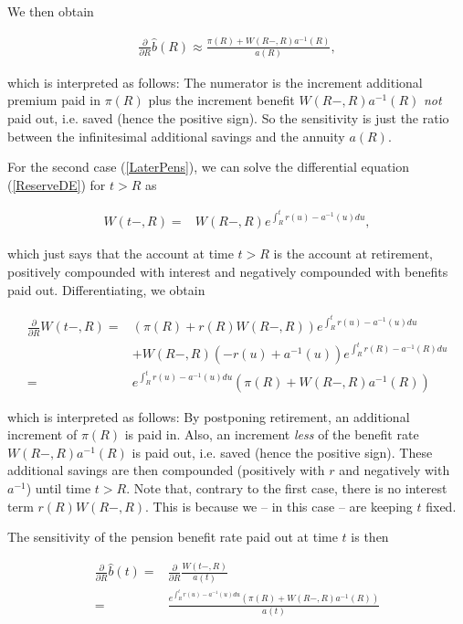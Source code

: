 \documentclass{article}
\newcommand{\1}[1]{\mathbbm{1}_{\left\lbrace #1 \right\rbrace}}
\theoremstyle{break}
\theoremstyle{remark}
\numberwithin{equation}{section}
\begin{document}
We then obtain

\begin{align*}
	\frac{\partial}{\partial R} \hat{b}(R) \approx \frac{\pi(R) + W(R-,R) a^{-1}(R)}{a(R)},
\end{align*}

which is interpreted as follows: The numerator is the increment additional premium paid in $\pi(R)$ plus the increment benefit $W(R-,R) a^{-1}(R)$ \textit{not} paid out, i.e. saved (hence the positive sign). So the sensitivity is just the ratio between the  infinitesimal additional savings and the annuity $a(R)$.

For the second case (\ref{LaterPens}), we can solve the differential equation (\ref{ReserveDE}) for $t>R$ as

\begin{align} \label{ReserveAfterRetirement}
	W(t-,R) =& W(R-,R) e^{\int_R^t r(u) - a^{-1}(u) du},
\end{align}

which just says that the account at time $t>R$ is the account at retirement, positively compounded with interest and negatively compounded with benefits paid out. Differentiating, we obtain

\begin{align*}
	\frac{\partial}{\partial R} W(t-,R) =& \left( \pi(R) + r(R) W(R-,R) \right) e^{\int_R^t r(u) - a^{-1}(u) du} \\
	&+ W(R-,R) \left( - r(u) + a^{-1}(u) \right) e^{\int_R^t r(R) - a^{-1}(R) du} \\
	=& e^{\int_R^t r(u) - a^{-1}(u) du} \left( \pi (R) + W(R-,R) a^{-1}(R) \right)
\end{align*}

which is interpreted as follows: By postponing retirement, an additional increment of $\pi(R)$ is paid in. Also, an increment \textit{less} of the benefit rate $W(R-,R) a^{-1}(R)$ is paid out, i.e. saved (hence the positive sign). These additional savings are then compounded (positively with $r$ and negatively with $a^{-1}$) until time $t>R$. Note that, contrary to the first case, there is no interest term $r(R)W(R-,R)$. This is because we -- in this case -- are keeping $t$ fixed.

The sensitivity of the pension benefit rate paid out at time $t$ is then

\begin{align*}
	\frac{\partial}{\partial R} \hat{b}(t) =& \frac{\partial}{\partial R} \frac{W(t-,R)}{a(t)} \\ =& \frac{e^{\int_R^t r(u) - a^{-1}(u) du} \left( \pi (R) + W(R-,R) a^{-1}(R) \right)}{a(t)}
\end{align*}
\end{document}
